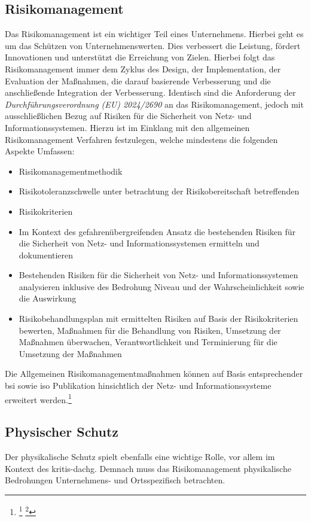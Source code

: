 \documentclass[11pt,a4paper,hidelinks]{article}   %
\begin{document}
        \subsection{Risikomanagement}
        Das Risikomanagement ist ein wichtiger Teil eines Unternehmens. Hierbei geht es um das Schützen von Unternehmenswerten. Dies verbessert die Leistung, fördert Innovationen und unterstützt die Erreichung von Zielen. Hierbei folgt das Risikomanagement immer dem Zyklus des Design, der Implementation, der Evaluation der Maßnahmen, die darauf basierende Verbesserung und die anschließende Integration der Verbesserung. Identisch sind die Anforderung der \emph{Durchführungsverordnung (EU) 2024/2690}  an das Risikomanagement, jedoch mit ausschließlichen Bezug auf Risiken für die Sicherheit von Netz- und Informationssystemen. Hierzu ist im Einklang mit den allgemeinen Risikomanagement Verfahren festzulegen, welche mindestens die folgenden Aspekte Umfassen:
        \begin{itemize}
            \item Risikomanagementmethodik
            \item Risikotoleranzschwelle unter betrachtung der Risikobereitschaft  betreffenden 
            \item Risikokriterien
            \item Im Kontext des gefahrenübergreifenden Ansatz die bestehenden Risiken für die Sicherheit von Netz- und Informationssystemen ermitteln und dokumentieren
            \item Bestehenden Risiken für die Sicherheit von Netz- und Informationssystemen analysieren inklusive des Bedrohung Niveau und der Wahrscheinlichkeit sowie die Auswirkung 
            \item Risikobehandlungsplan mit ermittelten Risiken auf Basis der Risikokriterien bewerten, Maßnahmen für die Behandlung von Risiken, Umsetzung der Maßnahmen überwachen, Verantwortlichkeit und Terminierung für die Umsetzung der Maßnahmen 
        \end{itemize}
        Die Allgemeinen Risikomanagementmaßnahmen können auf Basis entsprechender \gls{bsi} sowie \gls{iso} Publikation hinsichtlich der Netz- und Informationssysteme erweitert werden.\footnote{
            \footcite[Vgl. S. V, 2 - 4][]{iso31000-2018}
            \footcite[Vgl. S. 7, 9 - 10][]{bsi-200-3}
        }
        
        \subsection{Physischer Schutz}
        Der physikalische Schutz spielt ebenfalls eine wichtige Rolle, vor allem im Kontext des \gls{kritis-dachg}. Demnach muss das Risikomanagement physikalische Bedrohungen Unternehmens- und Ortsspezifisch betrachten.
\end{document}
